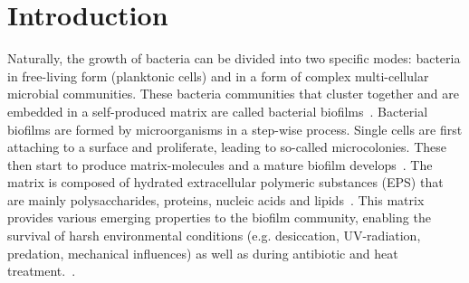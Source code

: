 \documentclass[foods,article,submit,moreauthors,pdftex]{Definitions/mdpi}
\begin{document}


\section{Introduction}

Naturally, the growth of bacteria can be divided into two specific modes: bacteria in free-living form (planktonic cells) and in a form of complex multi-cellular microbial communities. These bacteria communities that cluster together and are embedded in a self-produced matrix are called bacterial biofilms~\cite{flemming_biofilms:_2016}. Bacterial biofilms are formed by microorganisms in a step-wise process. Single cells are first attaching to a surface and proliferate, leading to so-called microcolonies. These then start to produce matrix-molecules and a mature biofilm develops~\cite{GIAOURIS2018309}. 
The matrix is composed of hydrated extracellular polymeric substances (EPS) that are mainly polysaccharides, proteins, nucleic acids and lipids~\cite{flemming_biofilm_2010}. This matrix provides various emerging properties to the biofilm community, enabling the survival of harsh environmental conditions (e.g. desiccation, UV-radiation, predation, mechanical influences) as well as during antibiotic and heat treatment.~\cite{doi:10.1128/AEM.65.5.2025-2031.1999,GILBERT2002203,doi:10.1080/08927019609386290,bridier_resistance_2011,10.1093/femsre/fux010}.
\end{document}
